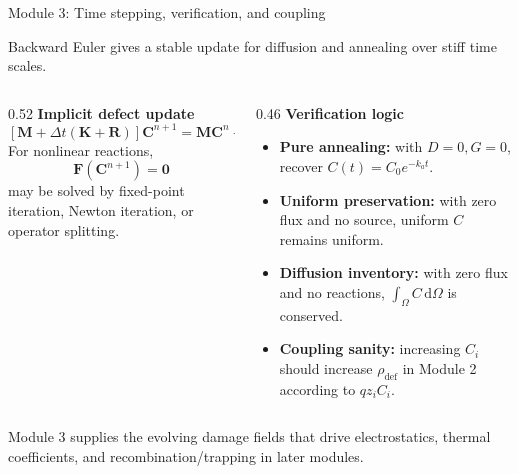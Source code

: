 \documentclass[aspectratio=169,9pt]{beamer}
\newcommand{\dd}{\,\mathrm{d}}
\newcommand{\vect}[1]{\bm{#1}}
\newcommand{\mat}[1]{\mathbf{#1}}
\begin{document}
\begin{frame}{Module 3: Time stepping, verification, and coupling}
\footnotesize
\vspace{-3mm}
\begin{bluebox}
\centering
Backward Euler gives a stable update for diffusion and annealing over stiff time scales.
\end{bluebox}

\vspace{1mm}
\begin{columns}[T,totalwidth=\textwidth]
\begin{column}{0.52\textwidth}
\textbf{Implicit defect update}
\begin{equation*}
\boxed{\left[\mat{M}+\Delta t(\mat{K}+\mat{R})\right]\vect{C}^{n+1}
=\mat{M}\vect{C}^{n}+\Delta t\,\vect{g}^{n+1}}
\end{equation*}
\small
For nonlinear reactions,
\begin{equation*}
\boxed{\mat{F}(\vect{C}^{n+1})=\vect{0}}
\end{equation*}
may be solved by fixed-point iteration, Newton iteration, or operator splitting.
\end{column}
\begin{column}{0.46\textwidth}
\textbf{Verification logic}
\begin{itemize}\setlength\itemsep{0.45mm}
\item \textbf{Pure annealing:} with \(D=0, G=0\), recover \(C(t)=C_0e^{-k_at}\).
\item \textbf{Uniform preservation:} with zero flux and no source, uniform \(C\) remains uniform.
\item \textbf{Diffusion inventory:} with zero flux and no reactions, \(\int_\Omega C\dd\Omega\) is conserved.
\item \textbf{Coupling sanity:} increasing \(C_i\) should increase \(\rho_{\mathrm{def}}\) in Module 2 according to \(qz_iC_i\).
\end{itemize}
\end{column}
\end{columns}

\vspace{1mm}
\begin{orangebox}
\centering\scriptsize
Module 3 supplies the evolving damage fields that drive electrostatics, thermal coefficients, and recombination/trapping in later modules.
\end{orangebox}
\end{frame}
\end{document}
